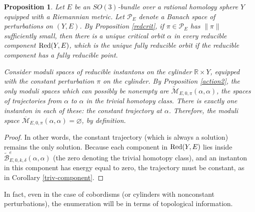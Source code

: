 \documentclass{memo-l}
\newtheorem{proposition}[theorem]{Proposition}
\theoremstyle{definition}
\theoremstyle{remark}
\numberwithin{section}{chapter}
\numberwithin{equation}{chapter}
\begin{document}
\begin{proposition}\label{red-flowlines}Let $E$ be an $SO(3)$-bundle over a rational homology sphere $Y$ equipped with a Riemannian metric. Let $\mathcal P_E$ denote a Banach space of perturbations on $(Y,E)$. By Proposition \ref{redcrit}, if $\pi \in \mathcal P_E$ has $\|\pi\|$ sufficiently small, then there is a unique critical orbit $\alpha$ in every reducible component $\textup{Red}(Y,E)$, which is the unique fully reducible orbit if the reducible component has a fully reducible point.

Consider moduli spaces of reducible instantons on the cylinder $\mathbb R \times Y$, equipped with the constant perturbation $\pi$ on the cylinder. By Proposition \ref{action2}, the only moduli spaces which can possibly be nonempty are $\widetilde{\mathcal M}_{E,0,\pi}(\alpha, \alpha)$, the spaces of trajectories from $\alpha$ to $\alpha$ in the trivial homotopy class. There is exactly one instanton in each of these: the constant trajectory at $\alpha$. Therefore, the moduli space $\overline{\mathcal M}_{E,0,\pi}(\alpha, \alpha) = \varnothing$, by definition.
\end{proposition}

\begin{proof}In other words, the constant trajectory (which is always a solution) remains the only solution. Because each component in $\textup{Red}(Y,E)$ lies inside $\widetilde{\mathcal B}^e_{E,0,k,\delta}(\alpha, \alpha)$ (the zero denoting the trivial homotopy class), and an instanton in this component has energy equal to zero, the trajectory must be constant, as in Corollary \ref{triv-component}.
\end{proof}

In fact, even in the case of cobordisms (or cylinders with nonconstant perturbations), the enumeration will be in terms of topological information.
\end{document}
